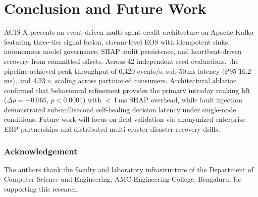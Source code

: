 \documentclass[runningheads]{llncs}
\begin{document}
\section{Conclusion and Future Work}
\label{sec:conclusion}
ACIS-X presents an event-driven multi-agent credit architecture on Apache Kafka featuring three-tier signal fusion, stream-level EOS with idempotent sinks, autonomous model governance, SHAP audit persistence, and heartbeat-driven recovery from committed offsets. Across 42 independent seed evaluations, the pipeline achieved peak throughput of 6,420 events/s, sub-50\,ms latency (P95 16.2\,ms), and $4.93\times$ scaling across partitioned consumers. Architectural ablation confirmed that behavioural refinement provides the primary intraday ranking lift ($\Delta\rho=+0.065$, $p<0.0001$) with $<$\,1\,ms SHAP overhead, while fault injection demonstrated sub-millisecond self-healing decision latency under single-node conditions. Future work will focus on field validation via anonymized enterprise ERP partnerships and distributed multi-cluster disaster recovery drills.

\subsubsection*{Acknowledgement}
The authors thank the faculty and laboratory infrastructure of the Department of Computer Science and Engineering, AMC Engineering College, Bengaluru, for supporting this research.
\end{document}
